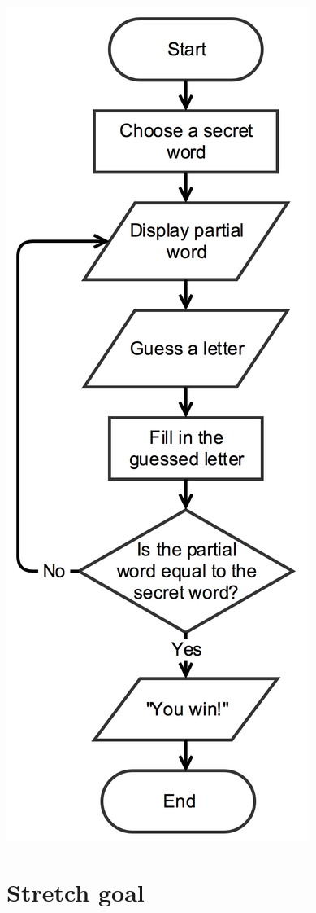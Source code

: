 \documentclass{scrartcl}
\begin{document}
\begin{center}
\includegraphics[height=0.5\textheight]{hangman_flowchart.png}
\end{center}

\section{Stretch goal} \label{stretch-a}
\end{document}
